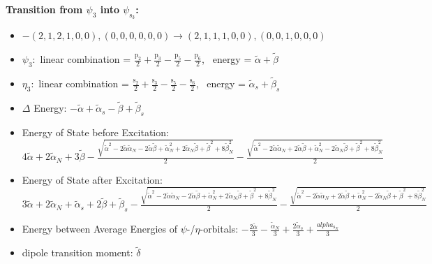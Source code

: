 \documentclass[12pt,a4paper]{article}
\begin{document}
        \noindent\textbf{Transition from $\psi_{3}$ into $\psi_{\text{s}_{3}}$:}
        \begin{itemize}
            \item $- (2, 1, 2, 1, 0, 0), (0, 0, 0, 0, 0, 0) \rightarrow (2, 1, 1, 1, 0, 0), (0, 0, 1, 0, 0, 0)$
        
            \item $\psi_{3}:$ linear combination = $\frac{\text{p}_{2}}{2} + \frac{\text{p}_{3}}{2} - \frac{\text{p}_{5}}{2} - \frac{\text{p}_{6}}{2}$, \
            energy = $\tilde{\alpha} + \tilde{\beta}$
            
            \item $\eta_{3}:$ linear combination = $\frac{\text{s}_{2}}{2} + \frac{\text{s}_{3}}{2} - \frac{\text{s}_{5}}{2} - \frac{\text{s}_{6}}{2}$, \
            energy = $\tilde{\alpha}_{s} + \tilde{\beta}_{s}$
            
                \item $\Delta$ Energy: $- \tilde{\alpha} + \tilde{\alpha}_{s} - \tilde{\beta} + \tilde{\beta}_{s}$
                \item Energy of State before Excitation: $4 \tilde{\alpha} + 2 \tilde{\alpha}_{N} + 3 \tilde{\beta} - \frac{\sqrt{\tilde{\alpha}^{2} - 2 \tilde{\alpha} \tilde{\alpha}_{N} - 2 \tilde{\alpha} \tilde{\beta} + \tilde{\alpha}_{N}^{2} + 2 \tilde{\alpha}_{N} \tilde{\beta} + \tilde{\beta}^{2} + 8 \tilde{\beta}_{N}^{2}}}{2} - \frac{\sqrt{\tilde{\alpha}^{2} - 2 \tilde{\alpha} \tilde{\alpha}_{N} + 2 \tilde{\alpha} \tilde{\beta} + \tilde{\alpha}_{N}^{2} - 2 \tilde{\alpha}_{N} \tilde{\beta} + \tilde{\beta}^{2} + 8 \tilde{\beta}_{N}^{2}}}{2}$
                \item Energy of State after Excitation: $3 \tilde{\alpha} + 2 \tilde{\alpha}_{N} + \tilde{\alpha}_{s} + 2 \tilde{\beta} + \tilde{\beta}_{s} - \frac{\sqrt{\tilde{\alpha}^{2} - 2 \tilde{\alpha} \tilde{\alpha}_{N} - 2 \tilde{\alpha} \tilde{\beta} + \tilde{\alpha}_{N}^{2} + 2 \tilde{\alpha}_{N} \tilde{\beta} + \tilde{\beta}^{2} + 8 \tilde{\beta}_{N}^{2}}}{2} - \frac{\sqrt{\tilde{\alpha}^{2} - 2 \tilde{\alpha} \tilde{\alpha}_{N} + 2 \tilde{\alpha} \tilde{\beta} + \tilde{\alpha}_{N}^{2} - 2 \tilde{\alpha}_{N} \tilde{\beta} + \tilde{\beta}^{2} + 8 \tilde{\beta}_{N}^{2}}}{2}$
                \item Energy between Average Energies of $\psi$-/$\eta$-orbitals: $- \frac{2 \tilde{\alpha}}{3} - \frac{\tilde{\alpha}_{N}}{3} + \frac{2 \tilde{\alpha}_{s}}{3} + \frac{alpha_{\text{s}_N}}{3}$
            
            \item dipole transition moment: $\tilde{\delta}$
        
        \end{itemize}
        
\end{document}
